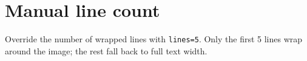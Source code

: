 \documentclass{article}
\begin{document}
\section*{Manual line count}

Override the number of wrapped lines with \texttt{lines=5}.
Only the first 5 lines wrap around the image; the rest fall back
to full text width.

\lipsum[1-10]
\end{document}
